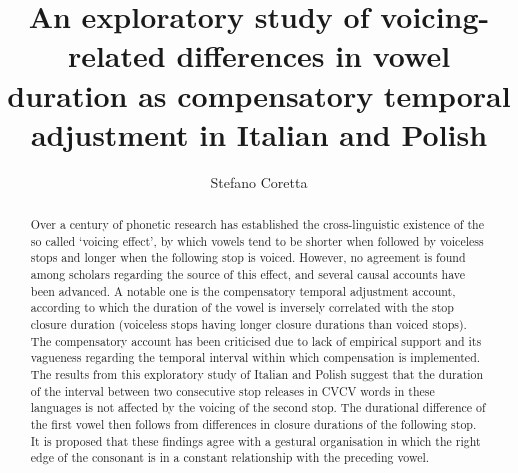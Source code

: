 \documentclass[preprint]{JASAnew}
\begin{document}

\title[Voicing-related differences in vowel duration as compensatory temporal
adjustment]{An exploratory study of voicing-related differences in vowel duration as
compensatory temporal adjustment in Italian and Polish}



\author{Stefano Coretta}






\begin{abstract}
Over a century of phonetic research has established the cross-linguistic
existence of the so called `voicing effect', by which vowels tend to be
shorter when followed by voiceless stops and longer when the following
stop is voiced. However, no agreement is found among scholars regarding
the source of this effect, and several causal accounts have been
advanced. A notable one is the compensatory temporal adjustment account,
according to which the duration of the vowel is inversely correlated
with the stop closure duration (voiceless stops having longer closure
durations than voiced stops). The compensatory account has been
criticised due to lack of empirical support and its vagueness regarding
the temporal interval within which compensation is implemented. The
results from this exploratory study of Italian and Polish suggest that
the duration of the interval between two consecutive stop releases in
CVCV words in these languages is not affected by the voicing of the
second stop. The durational difference of the first vowel then follows
from differences in closure durations of the following stop. It is
proposed that these findings agree with a gestural organisation in which
the right edge of the consonant is in a constant relationship with the
preceding vowel.
\end{abstract}
\end{document}
